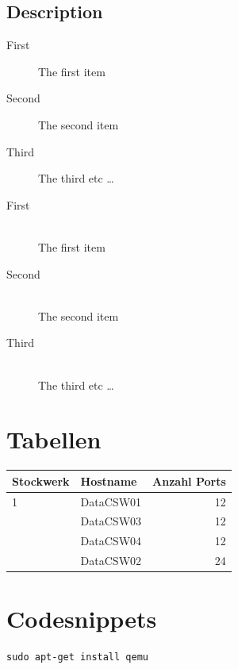 \documentclass[a4,12pt]{scrartcl}
\begin{document}
\subsection{Description}
\begin{description}
  \item[First] The first item
  \item[Second] The second item
  \item[Third] The third etc \ldots
\end{description}
\begin{description}
  \item[First] \hfill \\
  The first item
  \item[Second] \hfill \\
  The second item
  \item[Third] \hfill \\
  The third etc \ldots
\end{description}

\section{Tabellen}
\begin{center}
    \begin{tabular}{@{} l l r@{}}\toprule    
    {Stockwerk} & {Hostname} & {Anzahl Ports}\\ \midrule
    1 & DataCSW01 & 12\\ \addlinespace
    & DataCSW03 & 12\\ \addlinespace
    & DataCSW04 & 12\\ \addlinespace
    2& DataCSW02 & 24\\
    \bottomrule
    \end{tabular}
\end{center}

\section{Codesnippets}
\begin{lstlisting}
sudo apt-get install qemu
\end{lstlisting}
\end{document}
